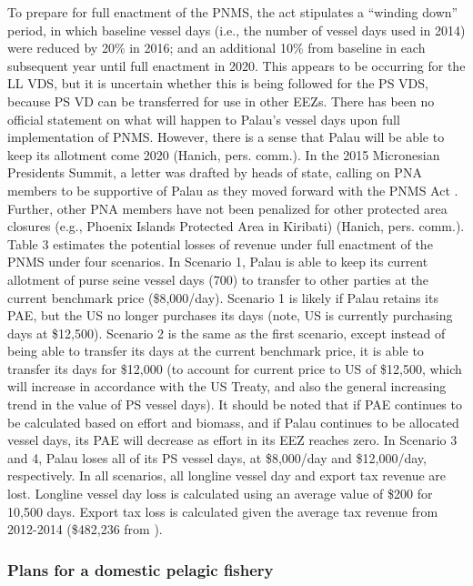 \documentclass[11pt,english]{article}
\begin{document}
To prepare for full enactment of the PNMS, the act stipulates a “winding down” period, in which baseline vessel days (i.e., the number of vessel days used in 2014) were reduced by 20\% in 2016; and an additional 10\% from baseline in each subsequent year until full enactment in 2020. This appears to be occurring for the LL VDS, but it is uncertain whether this is being followed for the PS VDS, because PS VD can be transferred for use in other EEZs. There has been no official statement on what will happen to Palau’s vessel days upon full implementation of PNMS. However, there is a sense that Palau will be able to keep its allotment come 2020 (Hanich, pers. comm.). In the 2015 Micronesian Presidents Summit, a letter was drafted by heads of state, calling on PNA members to be supportive of Palau as they moved forward with the PNMS Act \citep{Senase2015}. Further, other PNA members have not been penalized for other protected area closures (e.g., Phoenix Islands Protected Area in Kiribati) (Hanich, pers. comm.).
Table 3 estimates the potential losses of revenue under full enactment of the PNMS under four scenarios. In Scenario 1, Palau is able to keep its current allotment of purse seine vessel days (700) to transfer to other parties at the current benchmark price (\$8,000/day). Scenario 1 is likely if Palau retains its PAE, but the US no longer purchases its days (note, US is currently purchasing days at \$12,500). Scenario 2 is the same as the first scenario, except instead of being able to transfer its days at the current benchmark price, it is able to transfer its days for \$12,000 (to account for current price to US of \$12,500, which will increase in accordance with the US Treaty, and also the general increasing trend in the value of PS vessel days). It should be noted that if PAE continues to be calculated based on effort and biomass, and if Palau continues to be allocated vessel days, its PAE will decrease as effort in its EEZ reaches zero. In Scenario 3 and 4, Palau loses all of its PS vessel days, at \$8,000/day and \$12,000/day, respectively. In all scenarios, all longline vessel day and export tax revenue are lost. Longline vessel day loss is calculated using an average value of \$200 for 10,500 days. Export tax loss is calculated given the average tax revenue from 2012-2014 (\$482,236  from \cite{Gillett2016}). 

%

\subsubsection{Plans for a domestic pelagic fishery}
\end{document}
